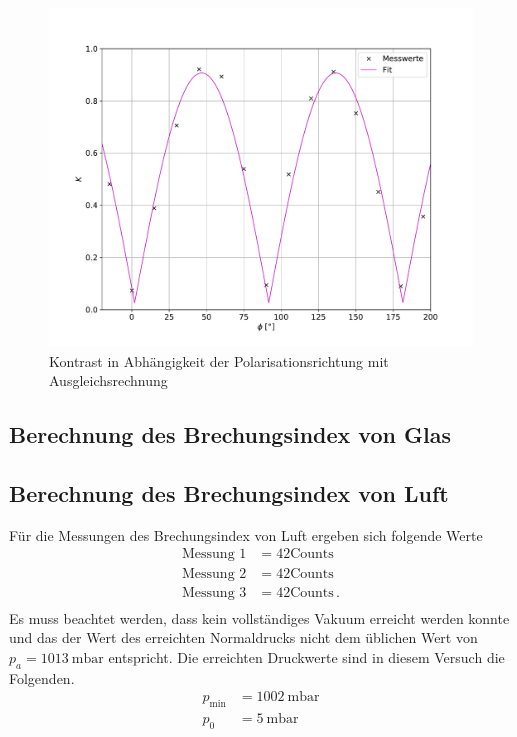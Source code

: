 \begin{figure}[H]
  \centering
  \includegraphics[width=\textwidth]{kontrast.pdf}
  \caption{Kontrast in Abhängigkeit der Polarisationsrichtung mit
  Ausgleichsrechnung}
  \label{fig:kontrast}
\end{figure}
\subsection{Berechnung des Brechungsindex von Glas}

\subsection{Berechnung des Brechungsindex von Luft}

Für die Messungen des Brechungsindex von Luft ergeben sich folgende Werte
\begin{align*}
  \text{Messung 1} &= 42 \text{Counts} \\
  \text{Messung 2} &= 42 \text{Counts} \\
  \text{Messung 3} &= 42 \text{Counts} \, . \\
\end{align*}
Es muss beachtet werden, dass kein vollständiges Vakuum erreicht werden konnte
und das der Wert des erreichten Normaldrucks nicht dem üblichen Wert von
$p_a= \SI{1013}{\milli\bar}$ \cite{druck} entspricht. Die erreichten Druckwerte sind in
diesem Versuch die Folgenden.
\begin{align*}
  p_{\text{min}} &= \SI{1002}{\milli\bar} \\
  p_0            &= \SI{5}{\milli\bar} \\
\end{align*}

